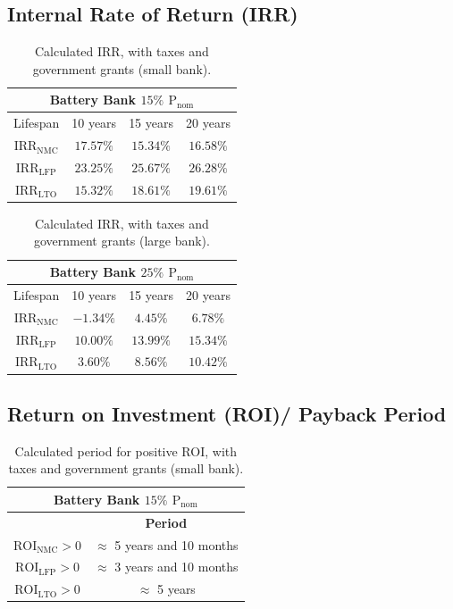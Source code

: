 \subsection{Internal Rate of Return (IRR)}

\begin{table}[H]
	\centering
	\caption{Calculated IRR, with taxes and government grants (small bank).}
	\label{tab:tir1cs}
	\begin{tabular}{|c|c|c|c|}
		\hline
		\multicolumn{4}{|c|}{Battery Bank $15\%$ ${\text{P}}_{\text{nom}}$} \\
		\hline\hline
	Lifespan  & 10 years & 15 years & 20 years\\
		 \hline
    ${\text{IRR}}_{\text{NMC}}$ & $17.57\%$ & $15.34\%$ & $16.58\%$ \\
		 \hline
	${\text{IRR}}_{\text{LFP}}$ & $23.25\%$ & $25.67\%$ & $26.28\%$\\
		 \hline
 	${\text{IRR}}_{\text{LTO}}$ & $15.32\%$ & $18.61\%$ & $19.61\%$\\
		 \hline
	\end{tabular}
\end{table}

\begin{table}[H]
	\centering
	\caption{Calculated IRR, with taxes and government grants (large bank).}
	\label{tab:tir2cs}
	\begin{tabular}{|c|c|c|c|}
		\hline
		\multicolumn{4}{|c|}{Battery Bank $25\%$ ${\text{P}}_{\text{nom}}$} \\
		\hline\hline
	Lifespan  & 10 years & 15 years & 20 years\\
		 \hline
    ${\text{IRR}}_{\text{NMC}}$ & $-1.34\%$ & $4.45\%$ & $6.78\%$ \\
		 \hline
	${\text{IRR}}_{\text{LFP}}$ & $10.00\%$ & $13.99\%$ & $15.34\%$\\
		 \hline
 	${\text{IRR}}_{\text{LTO}}$ & $3.60\%$ & $8.56\%$ & $10.42\%$\\
		 \hline
	\end{tabular}
\end{table}

\subsection{Return on Investment (ROI)/ Payback Period}

\begin{table}[H]
	\centering
	\caption{Calculated period for positive ROI, with taxes and government grants (small bank).}
	\label{tab:roi1cs}
	\begin{tabular}{|c|c|}
		\hline
		\multicolumn{2}{|c|}{Battery Bank $15\%$ ${\text{P}}_{\text{nom}}$} \\
		\hline\hline
		    & \textbf{Period}\\
		 \hline
	${\text{ROI}}_{\text{NMC}}>0$ & $\approx$ 5 years and 10 months\\
		 \hline
	${\text{ROI}}_{\text{LFP}}>0$ & $\approx$ 3 years and 10 months\\
		 \hline
 	${\text{ROI}}_{\text{LTO}}>0$ & $\approx$ 5 years \\
		 \hline
	\end{tabular}
\end{table}

